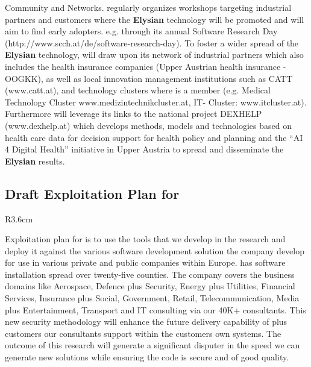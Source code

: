\documentclass[a4paper,11pt]{article}
\newcommand{\project}[1]{\textbf{#1}\xspace}
\newcommand{\SECURITY}{\project{Elysian}}
\newcommand{\TheProject}{\SECURITY}
\begin{document}
Community and Networks. \SCCHshort{} regularly organizes workshops targeting industrial partners and customers where the \TheProject{} technology will be promoted and will aim to find early adopters. e.g. through its annual Software Research Day (http://www.scch.at/de/software-research-day). To foster a wider spread of the \TheProject{} technology, \SCCHshort{} will draw upon its network of industrial partners which also includes the health insurance companies (Upper Austrian health insurance - OOGKK), as well as local innovation management institutions such as CATT (www.catt.at), and technology clusters where \SCCHshort{} is a member (e.g. Medical Technology Cluster www.medizintechnikcluster.at, IT- Cluster: www.itcluster.at). Furthermore \SCCHshort{} will leverage its links to the national project DEXHELP (www.dexhelp.at) which develops methods, models and technologies based on health care data for decision support for health policy and planning and the “AI 4 Digital Health” initiative in Upper Austria to spread and disseminate the \TheProject{} results.


\horizontalline

\subsection*{Draft Exploitation Plan for \SOPRAshort{}}
\vspace{-6pt}

\begin{wrapfigure}{R}{3.6cm}
\vspace{-1.3cm}
\hfill {}
\vspace{-0.8cm}
\end{wrapfigure}

Exploitation plan for \SOPRAlong{} is to use the tools that we develop in the research and deploy it against the various software development solution the company develop for use in various private and public companies within Europe. \SOPRAshort{} has software installation spread over twenty-five counties. The company covers the business domains like Aerospace, Defence plus Security, Energy plus Utilities, Financial Services, Insurance plus Social, Government, Retail, Telecommunication, Media plus Entertainment, Transport and IT consulting via our 40K+ consultants. This new security methodology will enhance the future delivery capability of \SOPRAshort{} plus customers our consultants support within the customers own systems. The outcome of this research will generate a significant disputer in the speed we can generate new solutions while ensuring the code is secure and of good quality.
\end{document}
